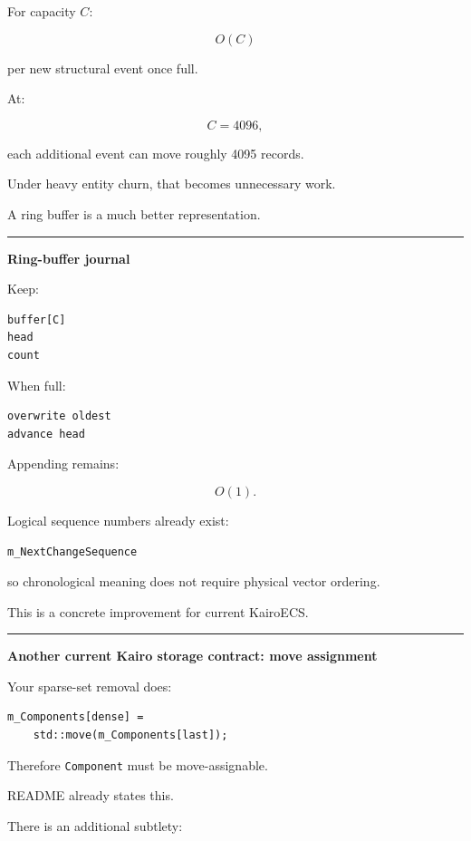 For capacity \(C\):

\[
O(C)
\]

per new structural event once full.

At:

\[
C=4096,
\]

each additional event can move roughly 4095 records.

Under heavy entity churn, that becomes unnecessary work.

A ring buffer is a much better representation.

\begin{center}\rule{0.5\linewidth}{0.5pt}\end{center}

\textbf{Ring-buffer journal}

Keep:

\begin{verbatim}
buffer[C]
head
count
\end{verbatim}

When full:

\begin{verbatim}
overwrite oldest
advance head
\end{verbatim}

Appending remains:

\[
O(1).
\]

Logical sequence numbers already exist:

\begin{verbatim}
m_NextChangeSequence
\end{verbatim}

so chronological meaning does not require physical vector ordering.

This is a concrete improvement for current KairoECS.

\begin{center}\rule{0.5\linewidth}{0.5pt}\end{center}

\textbf{Another current Kairo storage contract: move assignment}

Your sparse-set removal does:

\begin{verbatim}
m_Components[dense] =
    std::move(m_Components[last]);
\end{verbatim}

Therefore \texttt{Component} must be move-assignable.

README already states this.

There is an additional subtlety:

